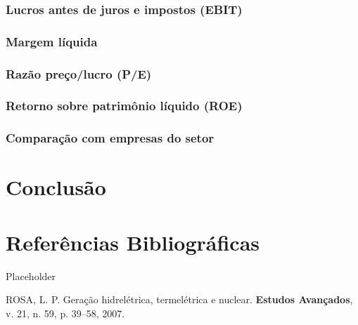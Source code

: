 \documentclass[grad,numbers]{coppe}
\newenvironment{cslreferences}%
  {}%
  {\par}
\begin{document}
  \hypertarget{lucros-antes-de-juros-e-impostos-ebit}{%
  \subsection{Lucros antes de juros e impostos (EBIT)}\label{lucros-antes-de-juros-e-impostos-ebit}}

  \hypertarget{margem-luxedquida}{%
  \subsection{Margem líquida}\label{margem-luxedquida}}

  \hypertarget{razuxe3o-preuxe7olucro-pe}{%
  \subsection{Razão preço/lucro (P/E)}\label{razuxe3o-preuxe7olucro-pe}}

  \hypertarget{retorno-sobre-patrimuxf4nio-luxedquido-roe}{%
  \subsection{Retorno sobre patrimônio líquido (ROE)}\label{retorno-sobre-patrimuxf4nio-luxedquido-roe}}

  \hypertarget{comparauxe7uxe3o-com-empresas-do-setor}{%
  \subsection{Comparação com empresas do setor}\label{comparauxe7uxe3o-com-empresas-do-setor}}

  \hypertarget{conclusuxe3o}{%
  \chapter{Conclusão}\label{conclusuxe3o}}

  \hypertarget{referuxeancias-bibliogruxe1ficas}{%
  \chapter*{Referências Bibliográficas}\label{referuxeancias-bibliogruxe1ficas}}

  Placeholder

  \hypertarget{refs}{}
  \begin{cslreferences}
  \leavevmode\hypertarget{ref-rosa2007}{}%
  ROSA, L. P. Geração hidrelétrica, termelétrica e nuclear. \textbf{Estudos Avançados}, v. 21, n. 59, p. 39--58, 2007.
  \end{cslreferences}
  \backmatter
  
  

\end{document}
